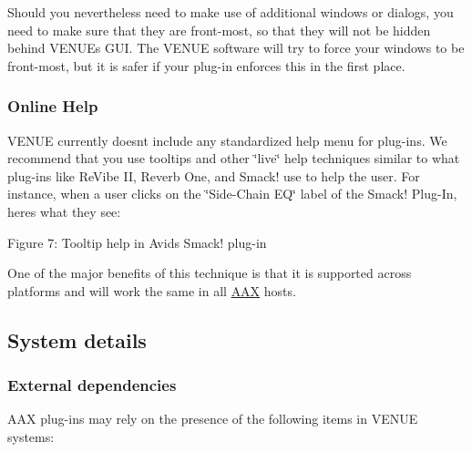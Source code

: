  Should you nevertheless need to make use of additional windows or dialogs, you need to make sure that they are front-\/most, so that they will not be hidden behind V\+E\+N\+UE\textquotesingle{}s G\+UI. The V\+E\+N\+UE software will try to force your windows to be front-\/most, but it is safer if your plug-\/in enforces this in the first place.

\hypertarget{a00849_subsection__aax_venue_guide__guidelines__help}{}\subsubsection{Online Help}\label{a00849_subsection__aax_venue_guide__guidelines__help}
 V\+E\+N\+UE currently doesn\textquotesingle{}t include any standardized help menu for plug-\/ins. We recommend that you use tooltips and other \char`\"{}live\char`\"{} help techniques similar to what plug-\/ins like Re\+Vibe II, Reverb One, and Smack! use to help the user. For instance, when a user clicks on the \char`\"{}\+Side-\/\+Chain E\+Q\char`\"{} label of the Smack! Plug-\/\+In, here\textquotesingle{}s what they see\+:

  Figure 7\+: Tooltip help in Avid\textquotesingle{}s Smack! plug-\/in

 One of the major benefits of this technique is that it is supported across platforms and will work the same in all \mbox{\hyperlink{a00852}{A\+AX}} hosts.



 \hypertarget{a00849_aax_venue_guide__system_details}{}\subsection{System details}\label{a00849_aax_venue_guide__system_details}
 \hypertarget{a00849_subsection__aax_venue_guide__system_details__dependencies}{}\subsubsection{External dependencies}\label{a00849_subsection__aax_venue_guide__system_details__dependencies}
 A\+AX plug-\/ins may rely on the presence of the following items in V\+E\+N\+UE systems\+:

